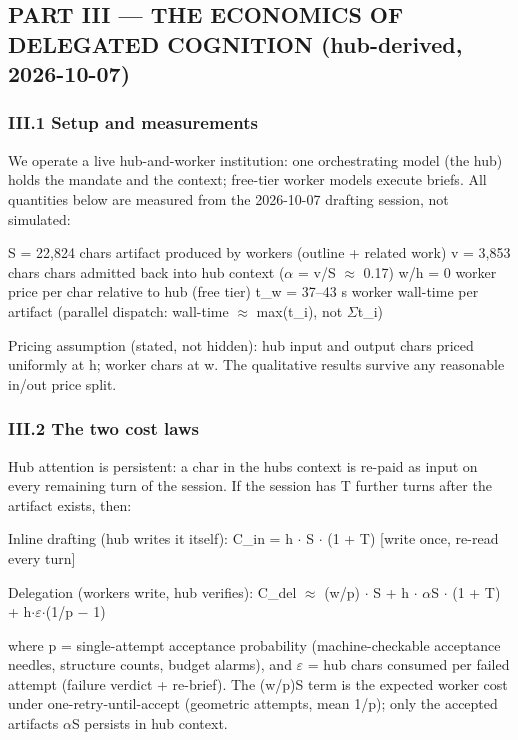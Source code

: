 \documentclass[
]{article}
\begin{document}
\subsection{PART III --- THE ECONOMICS OF DELEGATED COGNITION
(hub-derived,
2026-10-07)}\label{part-iii--the-economics-of-delegated-cognition-hub-derived-2026-10-07}

\subsubsection{III.1 Setup and
measurements}\label{iii1-setup-and-measurements}

We operate a live hub-and-worker institution: one orchestrating model
(the hub) holds the mandate and the context; free-tier worker models
execute briefs. All quantities below are measured from the 2026-10-07
drafting session, not simulated:

S = 22,824 chars artifact produced by workers (outline + related work) v
= 3,853 chars chars admitted back into hub context ($\alpha$ = v/S $\approx$ 0.17) w/h
= 0 worker price per char relative to hub (free tier) t\_w = 37--43 s
worker wall-time per artifact (parallel dispatch: wall-time $\approx$ max(t\_i),
not $\Sigma$t\_i)

Pricing assumption (stated, not hidden): hub input and output chars
priced uniformly at h; worker chars at w. The qualitative results
survive any reasonable in/out price split.

\subsubsection{III.2 The two cost laws}\label{iii2-the-two-cost-laws}

Hub attention is persistent: a char in the hub\textquotesingle s context
is re-paid as input on every remaining turn of the session. If the
session has T further turns after the artifact exists, then:

Inline drafting (hub writes it itself): C\_in = h $\cdot$ S $\cdot$ (1 + T) {[}write
once, re-read every turn{]}

Delegation (workers write, hub verifies): C\_del $\approx$ (w/p) $\cdot$ S + h $\cdot$ $\alpha$S $\cdot$
(1 + T) + h$\cdot$$\varepsilon$$\cdot$(1/p $-$ 1)

where p = single-attempt acceptance probability (machine-checkable
acceptance needles, structure counts, budget alarms), and $\varepsilon$ = hub chars
consumed per failed attempt (failure verdict + re-brief). The (w/p)S
term is the expected worker cost under one-retry-until-accept (geometric
attempts, mean 1/p); only the accepted artifact\textquotesingle s $\alpha$S
persists in hub context.
\end{document}
